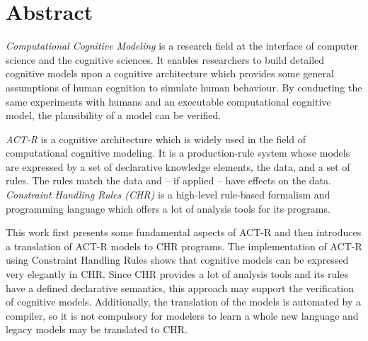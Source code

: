\chapter*{Abstract}

\emph{Computational Cognitive Modeling} is a research field at the interface of computer science and the cognitive sciences. It enables researchers to build detailed cognitive models upon a cognitive architecture which provides some general assumptions of human cognition to simulate human behaviour. By conducting the same experiments with humans and an executable computational cognitive model, the plausibility of a model can be verified.

\emph{ACT-R} is a cognitive architecture which is widely used in the field of computational cognitive modeling. It is a production-rule system whose models are expressed by a set of declarative knowledge elements, the data, and a set of rules. The rules match the data and -- if applied -- have effects on the data. \emph{Constraint Handling Rules (CHR)} is a high-level rule-based formalism and programming language which offers a lot of analysis tools for its programs. 

This work first presents some fundamental aspects of ACT-R and then introduces a translation of ACT-R models to CHR programs. The implementation of ACT-R using Constraint Handling Rules shows that cognitive models can be expressed very elegantly in CHR. Since CHR provides a lot of analysis tools and its rules have a defined declarative semantics, this approach may support the verification of cognitive models. Additionally, the translation of the models is automated by a compiler, so it is not compulsory for modelers to learn a whole new language and legacy models may be translated to CHR.